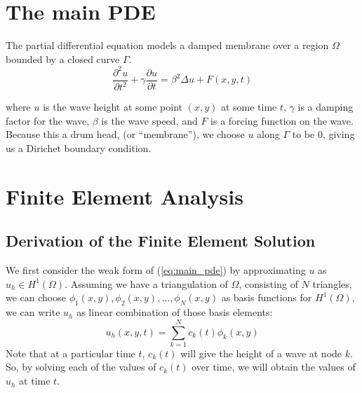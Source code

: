 \documentclass[a4paper,12pt]{article}
\begin{document}
\newcommand{\innerproduct}[2]{\int\limits_{\Omega} #1 #2 d\Omega}
\newcommand{\innerproductdot}[2]{\int\limits_{\Omega} \nabla #1 \cdot \nabla #2 d\Omega}
\newcommand{\firstderivative}[2]{\frac{d #1}{d #2}}
\newcommand{\secondderivative}[2]{\frac{d^2 #1}{d #2^2}}
\newcommand{\firstpartial}[2]{\frac{\partial #1}{\partial #2}}
\newcommand{\secondpartial}[2]{\frac{\partial^2 #1}{\partial #2^2}}
\newcommand{\laplacian}[1]{\Delta #1}
\newcommand{\secondfinitediff}[1]{\frac{#1^{n+1} - 2#1^n + #1^{n-1}}{\delta t^2}}
\newcommand{\firstfinitediff}[1]{\frac{#1^{n+1} - #1^{n-1}}{2\delta t}}
\newcommand{\step}[1]{\left( \frac{1}{\delta t^2} #1 \frac{\gamma}{2\delta t} \right)}

\section{The main PDE}
The partial differential equation models a damped membrane over a region $\Omega$ bounded by a closed curve $\Gamma$.
\begin{equation} \label{eq:main_pde}
\secondpartial{u}{t} + \gamma \firstpartial{u}{t}
=
\beta^2 \laplacian{u} + F(x,y,t)
\end{equation}

where $u$ is the wave height at some point $(x,y)$ at some time $t$, $\gamma$ is a damping factor for the wave,
$\beta$ is the wave speed, and $F$ is a forcing function on the wave. Because this a drum head, (or ``membrane''), we choose
$u$ along $\Gamma$ to be 0, giving us a Dirichet boundary condition.

\section{Finite Element Analysis}
\subsection{Derivation of the Finite Element Solution}
We first consider the weak form of (\ref{eq:main_pde}) by approximating $u$ as $u_h \in H^1(\Omega)$. Assuming we have
a triangulation of $\Omega$, consisting of $N$ triangles, we can choose 
$\phi_1(x,y), \phi_2(x,y), \ldots, \phi_N(x,y)$ as basis functions for $H^1(\Omega)$, we can write $u_h$ as linear
combination of those basis elements:
\begin{equation} \label{eq:u_h}
u_h(x,y,t) = \sum\limits_{k=1}^N c_k(t) \phi_k(x,y)
\end{equation}
Note that at a particular time $t$, $c_k(t)$ will give the height of a wave at node $k$. So, by solving each of the values
of $c_k(t)$ over time, we will obtain the values of $u_h$ at time $t$.
\end{document}
